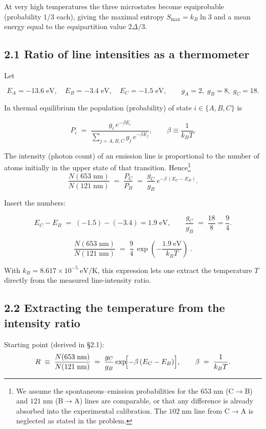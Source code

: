 \documentclass[12pt]{article}
\theoremstyle{definition} %
\theoremstyle{plain} %
\begin{document}
At very high temperatures the three microstates become equiprobable
(probability \(1/3\) each), giving the maximal entropy  
\(S_{\max}=k_B\ln 3\) and a mean energy equal to the
equipartition value \(2\Delta/3\).
\subsection*{2.1  Ratio of line intensities as a thermometer}

Let  

\[
  E_A=-13.6\;\text{eV}, 
  \quad 
  E_B=-3.4\;\text{eV},
  \quad 
  E_C=-1.5\;\text{eV},
\qquad
  g_A=2,\; g_B=8,\; g_C=18 .
\]

In thermal equilibrium the population (probability) of state \(i\in\{A,B,C\}\) is  

\[
  P_i \;=\; \frac{g_i\,e^{-\beta E_i}}{\displaystyle\sum_{j=A,B,C} g_j\,e^{-\beta E_j}},
  \qquad 
  \beta \equiv \frac{1}{k_B T}.
\]

The intensity (photon count) of an emission line is proportional to the
number of atoms initially in the upper state of that transition.
Hence\footnote{%
  We assume the spontaneous–emission probabilities for the
  \(653\;\text{nm}\) (C\(\!\to\)B) and \(121\;\text{nm}\) (B\(\!\to\)A) lines
  are comparable, or that any difference is already absorbed into the
  experimental calibration.  The \(102\;\text{nm}\) line from C\(\!\to\)A
  is neglected as stated in the problem.}
%
\[
  \frac{N(653\;\text{nm})}{N(121\;\text{nm})}
  \;=\;
  \frac{P_C}{P_B}
  \;=\;
  \frac{g_C}{g_B}\,
  e^{-\beta\,(E_C-E_B)}.
\]

Insert the numbers:

\[
  E_C - E_B \;=\; (-1.5) - (-3.4) = 1.9\;\text{eV},
  \qquad
  \frac{g_C}{g_B} \;=\; \frac{18}{8}= \frac{9}{4}.
\]

\[
  \boxed{
  \displaystyle
  \frac{N(653\;\text{nm})}{N(121\;\text{nm})}
  \;=\;
  \frac{9}{4}\,
  \exp\!\left(
     -\frac{1.9\ \text{eV}}{k_B T}
  \right)}
  \;.
\]

With \(k_B = 8.617\times10^{-5}\ \text{eV/K}\), this expression lets one extract the
temperature \(T\) directly from the measured line-intensity ratio.
\subsection*{2.2  Extracting the temperature from the intensity ratio}

Starting point (derived in §2.1):
\[
   R \;\equiv\; 
   \frac{N(653\;\text{nm})}{N(121\;\text{nm})}
   \;=\;
   \frac{g_C}{g_B}
   \exp\!\Bigl[-\beta\,(E_C-E_B)\Bigr],
   \qquad 
   \beta \;=\; \frac{1}{k_B T}.
\]
\end{document}
